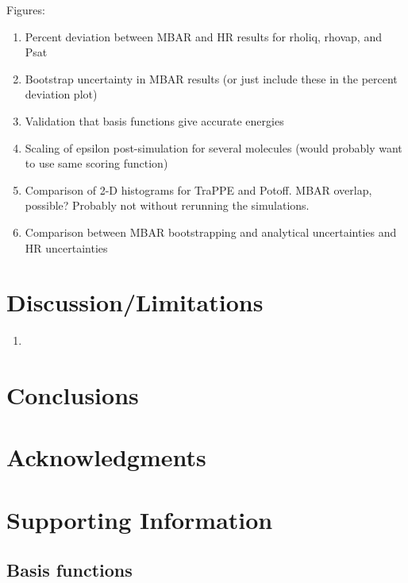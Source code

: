 \documentclass[11pt,a4paper]{article}
\begin{document}
Figures:

\begin{enumerate}
	\item Percent deviation between MBAR and HR results for rholiq, rhovap, and Psat
	\item Bootstrap uncertainty in MBAR results (or just include these in the percent deviation plot)
	\item Validation that basis functions give accurate energies
	\item Scaling of epsilon post-simulation for several molecules (would probably want to use same scoring function)
	\item Comparison of 2-D histograms for TraPPE and Potoff. MBAR overlap, possible? Probably not without rerunning the simulations.
	\item Comparison between MBAR bootstrapping and analytical uncertainties and HR uncertainties
\end{enumerate}

\section{Discussion/Limitations}

\begin{enumerate}
	\item 
\end{enumerate}

\section{Conclusions}

\section{Acknowledgments}

\section{Supporting Information}

\subsection{Basis functions}
\end{document}

